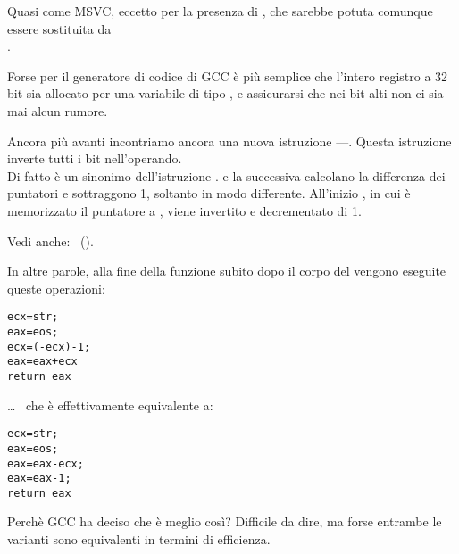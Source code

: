 Quasi come MSVC, eccetto per la presenza di \MOVZX, che sarebbe potuta comunque essere sostituita da \\
.

Forse per il generatore di codice di GCC è più semplice  che l'intero registro a 32 bit \EDX sia allocato per
una variabile di tipo \Tchar, e assicurarsi che nei bit alti non ci sia mai alcun rumore.

\label{strlen_NOT_ADD}

Ancora più avanti incontriamo ancora una nuova istruzione ---\NOT. Questa istruzione inverte tutti i bit nell'operando. \\
Di fatto è un sinonimo dell'istruzione . 
\NOT e la successiva \ADD calcolano la differenza dei puntatori e sottraggono 1, soltanto in modo differente. 
All'inizio \ECX, in cui è memorizzato il puntatore a , viene invertito e decrementato di 1.

Vedi anche: \q{\SignedNumbersSectionName}~().
 
In altre parole, alla fine della funzione subito dopo il corpo del vengono eseguite queste operazioni:

\begin{lstlisting}[style=customc]
ecx=str;
eax=eos;
ecx=(-ecx)-1; 
eax=eax+ecx
return eax
\end{lstlisting}

\dots~ che è effettivamente equivalente a:

\begin{lstlisting}[style=customc]
ecx=str;
eax=eos;
eax=eax-ecx;
eax=eax-1;
return eax
\end{lstlisting}

Perchè GCC ha deciso che è meglio così? Difficile da dire, ma forse entrambe le varianti sono equivalenti in termini di efficienza.
